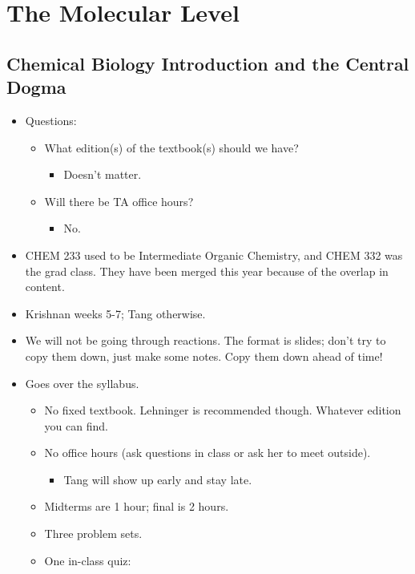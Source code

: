 \documentclass[../notes.tex]{subfiles}
\begin{document}
\chapter{The Molecular Level}
\section{Chemical Biology Introduction and the Central Dogma}
\begin{itemize}
    \item {}Questions:
    \begin{itemize}
        \item What edition(s) of the textbook(s) should we have?
        \begin{itemize}
            \item Doesn't matter.
        \end{itemize}
        \item Will there be TA office hours?
        \begin{itemize}
            \item No.
        \end{itemize}
    \end{itemize}
    \item CHEM 233 used to be Intermediate Organic Chemistry, and CHEM 332 was the grad class. They have been merged this year because of the overlap in content.
    \item Krishnan weeks 5-7; Tang otherwise.
    \item We will not be going through reactions. The format is slides; don't try to copy them down, just make some notes. Copy them down ahead of time!
    \item Goes over the syllabus.
    \begin{itemize}
        \item No fixed textbook. Lehninger is recommended though. Whatever edition you can find.
        \item No office hours (ask questions in class or ask her to meet outside).
        \begin{itemize}
            \item Tang will show up early and stay late.
        \end{itemize}
        \item Midterms are 1 hour; final is 2 hours.
        \item Three problem sets.
        \item One in-class quiz:
        \begin{itemize}

\end{itemize}
\end{itemize}
\end{itemize}
\end{document}
